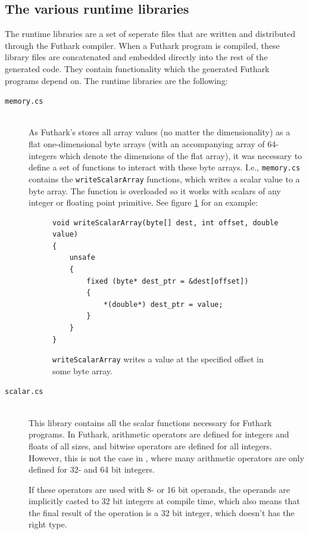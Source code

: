 \subsection{The various runtime libraries}
The runtime libraries are a set of seperate \csharp{} files that are written and
distributed through the Futhark compiler. When a Futhark program is compiled,
these library files are concatenated and embedded directly into the rest of the
generated code. They contain functionality which the generated Futhark programs
depend on.
The runtime libraries are the following:
\begin{description}
\item[\texttt{memory.cs}] \hfill\\
  As Futhark's stores all array values (no matter the dimensionality) as a flat one-dimensional byte arrays (with an accompanying
  array of 64-integers which denote the dimensions of the flat array), it was
  necessary to define a set of functions to interact with these byte arrays.
  I.e., \texttt{memory.cs} contains the \texttt{writeScalarArray} functions,
  which writes a scalar value to a byte array. The function is overloaded so it
  works with scalars of any integer or floating point primitive. See figure
  \ref{fig:writeScalarArray} for an example:

\begin{figure}[h]
\centering
\begin{verbatim}
void writeScalarArray(byte[] dest, int offset, double value)
{
    unsafe
    {
        fixed (byte* dest_ptr = &dest[offset])
        {
            *(double*) dest_ptr = value;
        }
    }
}
\end{verbatim}
\caption{\texttt{writeScalarArray} writes a value at the specified offset in
some byte array.}
\label{fig:writeScalarArray}
\end{figure}

\item[\texttt{scalar.cs}] \hfill\\
  This library contains all the scalar functions necessary for Futhark \csharp{}
  programs.
  In Futhark, arithmetic operators are defined for integers and floats of all
  sizes, and bitwise operators are defined for all integers.
  However, this is not the case in \csharp{}, where many arithmetic operators
  are only defined for 32- and 64 bit integers.
  
  If these operators are used with 8- or 16 bit operands, the operands are
  implicitly casted to 32 bit integers at compile time, which also means that
  the final result of the operation is a 32 bit integer, which doesn't has the
  right type.


\end{description}
